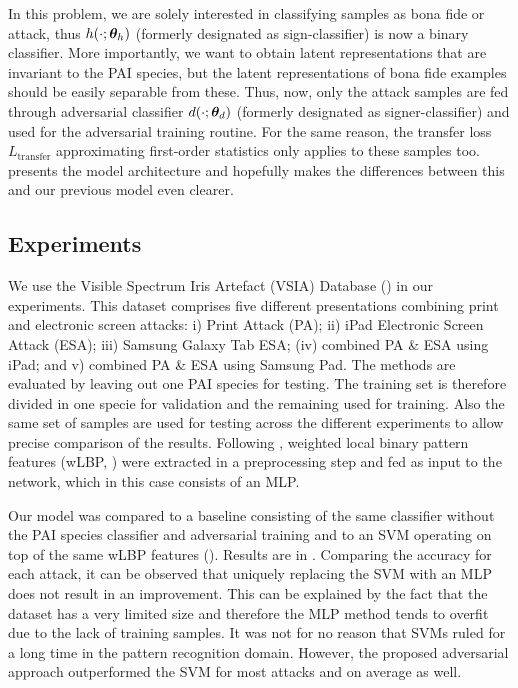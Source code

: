 In this problem, we are solely interested in classifying samples as bona fide or attack, thus $h(\cdot;{\bm{\theta}}_h)$ (formerly designated as sign-classifier) is now a binary classifier. More importantly, we want to obtain latent representations that are invariant to the PAI species, but the latent representations of bona fide examples should be easily separable from these. Thus, now, only the attack samples are fed through adversarial classifier $d(\cdot;{\bm{\theta}}_d)$ (formerly designated as signer-classifier) and used for the adversarial training routine. For the same reason, the transfer loss $L_{\text{transfer}}$ approximating first-order statistics only applies to these samples too.  presents the model architecture and hopefully makes the differences between this and our previous model even clearer.



\subsection{Experiments}
\label{sec:adv_iris_attack_experiments}
We use the Visible Spectrum Iris Artefact (VSIA) Database (\citet{raghavendra2015VSIA}) in our experiments. This dataset comprises five different presentations combining print and electronic screen attacks: i) Print Attack (PA); ii) iPad Electronic Screen Attack (ESA); iii) Samsung Galaxy Tab ESA; (iv) combined PA \& ESA using iPad; and v) combined PA \& ESA using Samsung Pad. The methods are evaluated by leaving out one PAI species for testing. The training set is therefore divided in one specie for validation and the remaining used for training. Also the same set of samples are used for testing across the different experiments to allow precise comparison of the results. Following \citet{sequeira2016realistic}, weighted local binary pattern features (wLBP, \citet{zhang2010contact}) were extracted in a preprocessing step and fed as input to the network, which in this case consists of an MLP.

Our model was compared to a baseline consisting of the same classifier without the PAI species classifier and adversarial training and to an SVM operating on top of the same wLBP features (\citet{sequeira2016realistic}). Results are in . Comparing the accuracy for each attack, it can be observed that uniquely replacing the SVM with an MLP does not result in an improvement. This can be explained by the fact that the dataset has a very limited size and therefore the MLP method tends to overfit due to the lack of training samples. It was not for no reason that SVMs ruled for a long time in the pattern recognition domain. However, the proposed adversarial approach outperformed the SVM for most attacks and on average as well.

